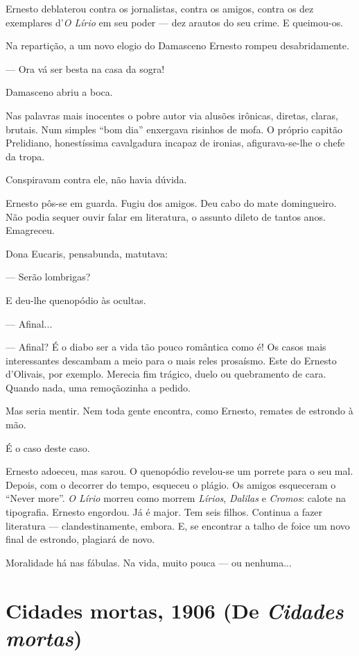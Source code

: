 Ernesto deblaterou contra os jornalistas, contra os amigos, contra os
dez exemplares d'\emph{O Lírio} em seu poder --- dez arautos do seu
crime. E queimou-os.

Na repartição, a um novo elogio do Damasceno Ernesto rompeu
desabridamente.

--- Ora vá ser besta na casa da sogra!

Damasceno abriu a boca.

Nas palavras mais inocentes o pobre autor via alusões irônicas, diretas,
claras, brutais. Num simples ``bom dia'' enxergava risinhos de mofa. O
próprio capitão Prelidiano, honestíssima cavalgadura incapaz de ironias,
afigurava-se-lhe o chefe da tropa.

Conspiravam contra ele, não havia dúvida.

Ernesto pôs-se em guarda. Fugiu dos amigos. Deu cabo do mate
domingueiro. Não podia sequer ouvir falar em literatura, o assunto
dileto de tantos anos. Emagreceu.

Dona Eucaris, pensabunda, matutava:

--- Serão lombrigas?

E deu-lhe quenopódio às ocultas.

--- Afinal...

--- Afinal? É o diabo ser a vida tão pouco romântica como é! Os casos
mais interessantes descambam a meio para o mais reles prosaísmo. Este do
Ernesto d'Olivais, por exemplo. Merecia fim trágico, duelo ou
quebramento de cara. Quando nada, uma remoçãozinha a pedido.

Mas seria mentir. Nem toda gente encontra, como Ernesto, remates de
estrondo à mão.

É o caso deste caso.

Ernesto adoeceu, mas sarou. O quenopódio revelou-se um porrete para o
seu mal. Depois, com o decorrer do tempo, esqueceu o plágio. Os amigos
esqueceram o ``Never more''. \emph{O Lírio} morreu como morrem
\emph{Lírios}, \emph{Dalilas} e \emph{Cromos}: calote na tipografia.
Ernesto engordou. Já é major. Tem seis filhos. Continua a fazer
literatura --- clandestinamente, embora. E, se encontrar a talho de
foice um novo final de estrondo, plagiará de novo.

Moralidade há nas fábulas. Na vida, muito pouca --- ou nenhuma...

\chapter{Cidades mortas, 1906 (De \emph{Cidades mortas})}

